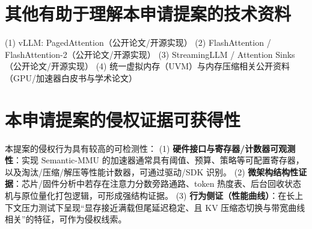 \documentclass[12pt,a4paper]{article}
\begin{document}
\section{其他有助于理解本申请提案的技术资料}

(1) vLLM: PagedAttention（公开论文/开源实现）
(2) FlashAttention / FlashAttention-2（公开论文/开源实现）
(3) StreamingLLM / Attention Sinks（公开论文/开源实现）
(4) 统一虚拟内存（UVM）与内存压缩相关公开资料（GPU/加速器白皮书与学术论文）

\section{本申请提案的侵权证据可获得性}

本提案的侵权行为具有较高的可检测性：
(1) \textbf{硬件接口与寄存器/计数器可观测性}：实现 Semantic-MMU 的加速器通常具有阈值、预算、策略等可配置寄存器，以及淘汰/压缩/解压等性能计数器，可通过驱动/SDK 识别。
(2) \textbf{微架构结构性证据}：芯片/固件分析中若存在注意力分数旁路通路、token 热度表、后台回收状态机与原位量化打包逻辑，可形成强结构证据。
(3) \textbf{行为侧证（性能曲线）}：在长上下文压力测试下呈现“显存接近满载但尾延迟稳定、且 KV 压缩态切换与带宽曲线相关”的特征，可作为侵权线索。
\end{document}

